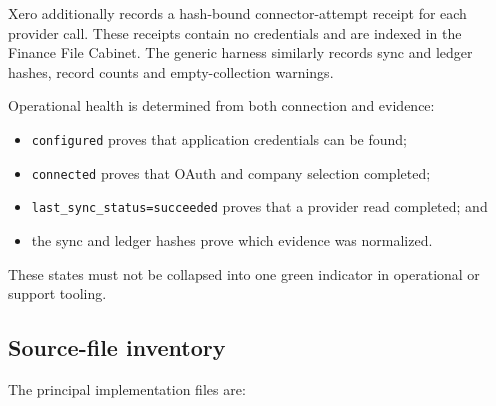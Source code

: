 Xero additionally records a hash-bound connector-attempt receipt for each
provider call.  These receipts contain no credentials and are indexed in the
Finance File Cabinet.  The generic harness similarly records sync and ledger
hashes, record counts and empty-collection warnings.

Operational health is determined from both connection and evidence:

\begin{itemize}[leftmargin=*]
  \item \texttt{configured} proves that application credentials can be found;
  \item \texttt{connected} proves that OAuth and company selection completed;
  \item \texttt{last\_sync\_status=succeeded} proves that a provider read
        completed; and
  \item the sync and ledger hashes prove which evidence was normalized.
\end{itemize}

These states must not be collapsed into one green indicator in operational or
support tooling.

\subsection{Source-file inventory}

The principal implementation files are:

